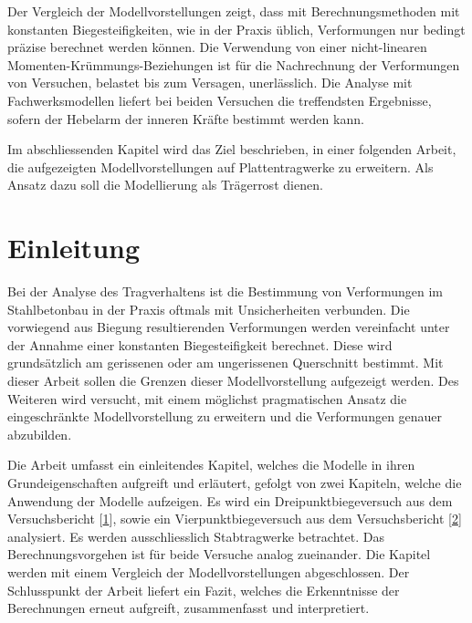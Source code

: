 \documentclass[
  12pt,
  letterpaper,
  egregdoesnotlikesansseriftitles]{scrreprt}
\renewcommand*\contentsname{Inhaltsverzeichnis}
\newcommand\contentsname{Inhaltsverzeichnis}
\begin{document}
Der Vergleich der Modellvorstellungen zeigt, dass mit Berechnungsmethoden mit konstanten Biegesteifigkeiten, wie in der Praxis üblich, Verformungen nur bedingt präzise berechnet werden können. Die Verwendung von einer nicht-linearen Momenten-Krümmungs-Beziehungen ist für die Nachrechnung der Verformungen von Versuchen, belastet bis zum Versagen, unerlässlich. Die Analyse mit Fachwerksmodellen liefert bei beiden Versuchen die treffendsten Ergebnisse, sofern der Hebelarm der inneren Kräfte bestimmt werden kann. 


Im abschliessenden Kapitel wird das Ziel beschrieben, in einer folgenden Arbeit, die aufgezeigten Modellvorstellungen auf Plattentragwerke zu erweitern. Als Ansatz dazu soll die Modellierung als Trägerrost dienen.

\ifdefined\Shaded\renewenvironment{Shaded}{\begin{tcolorbox}[boxrule=0pt, borderline west={3pt}{0pt}{shadecolor}, breakable, sharp corners, interior hidden, frame hidden, enhanced]}{\end{tcolorbox}}\fi

\renewcommand*\contentsname{Inhaltsverzeichnis}
{
\hypersetup{linkcolor=}
\setcounter{tocdepth}{1}
\tableofcontents
}
\listoffigures
\listoftables
{}

\hypertarget{einleitung}{%
\chapter{Einleitung}\label{einleitung}}

Bei der Analyse des Tragverhaltens ist die Bestimmung von Verformungen
im Stahlbetonbau in der Praxis oftmals mit Unsicherheiten verbunden. Die
vorwiegend aus Biegung resultierenden Verformungen werden vereinfacht
unter der Annahme einer konstanten Biegesteifigkeit berechnet. Diese
wird grundsätzlich am gerissenen oder am ungerissenen Querschnitt
bestimmt. Mit dieser Arbeit sollen die Grenzen dieser Modellvorstellung
aufgezeigt werden. Des Weiteren wird versucht, mit einem möglichst
pragmatischen Ansatz die eingeschränkte Modellvorstellung zu erweitern
und die Verformungen genauer abzubilden.

Die Arbeit umfasst ein einleitendes Kapitel, welches die Modelle in
ihren Grundeigenschaften aufgreift und erläutert, gefolgt von zwei
Kapiteln, welche die Anwendung der Modelle aufzeigen. Es wird ein
Dreipunktbiegeversuch aus dem Versuchsbericht
{[}\protect\hyperlink{ref-Jaeger2006}{1}{]}, sowie ein
Vierpunktbiegeversuch aus dem Versuchsbericht
{[}\protect\hyperlink{ref-Tue2019}{2}{]} analysiert. Es werden
ausschliesslich Stabtragwerke betrachtet. Das Berechnungsvorgehen ist
für beide Versuche analog zueinander. Die Kapitel werden mit einem
Vergleich der Modellvorstellungen abgeschlossen. Der Schlusspunkt der
Arbeit liefert ein Fazit, welches die Erkenntnisse der Berechnungen
erneut aufgreift, zusammenfasst und interpretiert.
\end{document}
